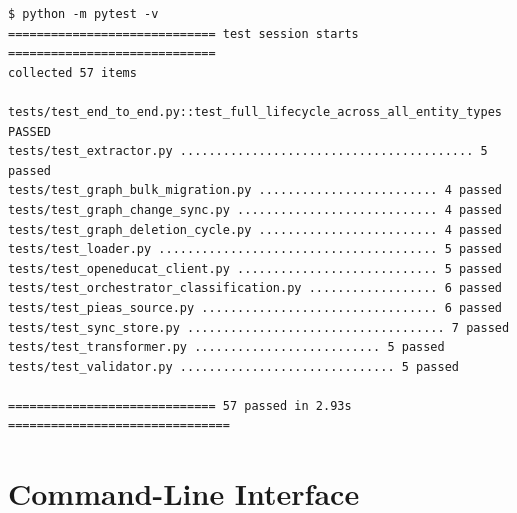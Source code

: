 \documentclass[11pt,a4paper]{article}
\begin{document}
\begin{lstlisting}[style=termstyle,caption={Actual output of the full suite.}]
$ python -m pytest -v
============================= test session starts =============================
collected 57 items

tests/test_end_to_end.py::test_full_lifecycle_across_all_entity_types    PASSED
tests/test_extractor.py ......................................... 5 passed
tests/test_graph_bulk_migration.py ......................... 4 passed
tests/test_graph_change_sync.py ............................ 4 passed
tests/test_graph_deletion_cycle.py ......................... 4 passed
tests/test_loader.py ....................................... 5 passed
tests/test_openeducat_client.py ............................ 5 passed
tests/test_orchestrator_classification.py .................. 6 passed
tests/test_pieas_source.py ................................. 6 passed
tests/test_sync_store.py .................................... 7 passed
tests/test_transformer.py .......................... 5 passed
tests/test_validator.py .............................. 5 passed

============================= 57 passed in 2.93s ===============================
\end{lstlisting}

\section{Command-Line Interface}
\end{document}
